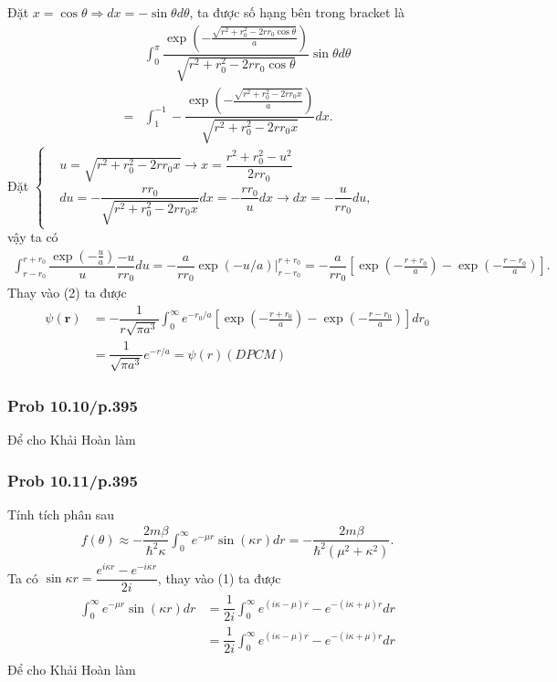 \documentclass{report}
\newcommand{\f}[2]{\dfrac{#1}{#2}}
\newcommand{\at}[2]{\bigg\rvert_{#1}^{#2} }
\begin{document}
Đặt $x = \cos\theta \Rightarrow dx = -\sin\theta d\theta$, ta được số hạng bên trong bracket là
\begin{align*}
	  & \int_{0}^{\pi}  \f{\exp\left(-\frac{\sqrt{r^2 + r_0^2 - 2rr_0\cos\theta}}{a}\right)}{\sqrt{r^2 + r_0^2 - 2rr_0\cos\theta}} \sin\theta  d\theta \\
	= & \int_{1}^{-1} -\f{\exp \left( -\frac{\sqrt{r^2 + r_0^2 - 2rr_0 x}}{a} \right) }{\sqrt{r^2 + r_0^2 - 2rr_0 x}} dx.
\end{align*}
Đặt
$
	\begin{cases}
		 & u = \sqrt{r^2 + r_0^2 - 2rr_0 x} \rightarrow x = \f{r^2 + r_0^2 - u^2}{2r r_0}                      \\
		 & du = -\f{rr_0}{\sqrt{r^2 + r_0^2 - 2rr_0 x}} dx = -\f{rr_0}{u} dx \rightarrow dx = -\f{u}{rr_0} du,
	\end{cases}
$\\
vậy ta có
\begin{align*}
	\int_{r-r_0}^{r+r_0}\f{\exp(-\frac{u}{a})}{u} \f{-u}{rr_0} du = -\f{a}{r r_0} \exp(-u/a)\at{r-r_0}{r+r_0} = -\f{a}{r r_0} \left[ \exp(-\frac{r+r_0}{a}) - \exp(-\frac{r-r_0}{a}) \right].
\end{align*}
Thay vào (2) ta được
\begin{align*}
	\psi(\mathbf{r})
	 & = -\f{1}{r\sqrt{\pi a^3}} \int_{0}^{\infty} e^{-r_0/a} \left[ \exp(-\frac{r+r_0}{a}) - \exp(-\frac{r-r_0}{a}) \right] dr_0 \\
	 & =  \f{1}{\sqrt{\pi a^3}} e^{-r/a} = \psi(r) (DPCM)
\end{align*}
\subsubsection{Prob 10.10/p.395}
Để cho Khải Hoàn làm
\subsubsection{Prob 10.11/p.395}
Tính tích phân sau
\begin{align*}
	f(\theta) \approx -\f{2m\beta}{\hbar^2 \kappa} \int_{0}^{\infty} e^{-\mu r} \sin(\kappa r) dr = - \f{2m\beta}{\hbar^2 (\mu^2 + \kappa^2)}. \tag{1}
\end{align*}
Ta có $\sin \kappa r = \f{e^{i\kappa r} - e^{-i\kappa r}}{2i}$, thay vào (1) ta được
\begin{align*}
	\int_{0}^{\infty} e^{-\mu r} \sin(\kappa r) dr
	 & = \f{1}{2i}\int_{0}^{\infty} e^{(i\kappa - \mu) r} - e^{-(i\kappa + \mu) r} dr \\
	 & = \f{1}{2i}\int_{0}^{\infty} e^{(i\kappa - \mu) r} - e^{-(i\kappa + \mu) r} dr \\
\end{align*}
Để cho Khải Hoàn làm
\end{document}
